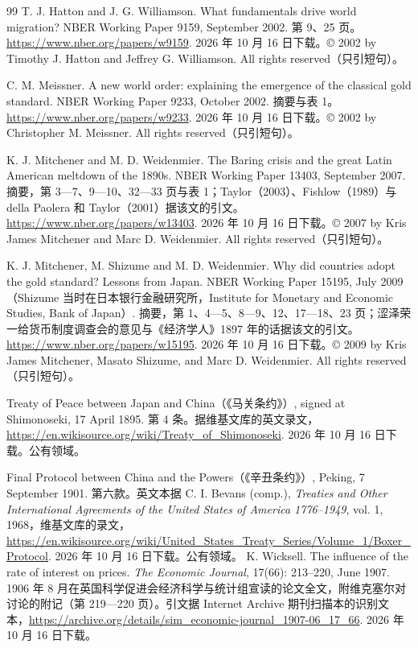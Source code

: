 \begin{thebibliography}{99}
 T. J. Hatton and J. G. Williamson. What fundamentals drive world migration? NBER Working Paper 9159, September 2002. 第 9、25 页。\url{https://www.nber.org/papers/w9159}. 2026 年 10 月 16 日下载。© 2002 by Timothy J. Hatton and Jeffrey G. Williamson. All rights reserved（只引短句）。

 C. M. Meissner. A new world order: explaining the emergence of the classical gold standard. NBER Working Paper 9233, October 2002. 摘要与表 1。\url{https://www.nber.org/papers/w9233}. 2026 年 10 月 16 日下载。© 2002 by Christopher M. Meissner. All rights reserved（只引短句）。

 K. J. Mitchener and M. D. Weidenmier. The Baring crisis and the great Latin American meltdown of the 1890s. NBER Working Paper 13403, September 2007. 摘要，第 3—7、9—10、32—33 页与表 1；Taylor（2003）、Fishlow（1989）与 della Paolera 和 Taylor（2001）据该文的引文。\url{https://www.nber.org/papers/w13403}. 2026 年 10 月 16 日下载。© 2007 by Kris James Mitchener and Marc D. Weidenmier. All rights reserved（只引短句）。

 K. J. Mitchener, M. Shizume and M. D. Weidenmier. Why did countries adopt the gold standard? Lessons from Japan. NBER Working Paper 15195, July 2009（Shizume 当时在日本银行金融研究所，Institute for Monetary and Economic Studies, Bank of Japan）. 摘要，第 1、4—5、8—9、12、17—18、23 页；涩泽荣一给货币制度调查会的意见与《经济学人》1897 年的话据该文的引文。\url{https://www.nber.org/papers/w15195}. 2026 年 10 月 16 日下载。© 2009 by Kris James Mitchener, Masato Shizume, and Marc D. Weidenmier. All rights reserved（只引短句）。

 Treaty of Peace between Japan and China（《马关条约》）, signed at Shimonoseki, 17 April 1895. 第 4 条。据维基文库的英文录文，\url{https://en.wikisource.org/wiki/Treaty_of_Shimonoseki}. 2026 年 10 月 16 日下载。公有领域。

 Final Protocol between China and the Powers（《辛丑条约》）, Peking, 7 September 1901. 第六款。英文本据 C. I. Bevans (comp.), \emph{Treaties and Other International Agreements of the United States of America 1776--1949}, vol. 1, 1968，维基文库的录文，\url{https://en.wikisource.org/wiki/United_States_Treaty_Series/Volume_1/Boxer_Protocol}. 2026 年 10 月 16 日下载。公有领域。
 K. Wicksell. The influence of the rate of interest on prices. \emph{The Economic Journal}, 17(66): 213--220, June 1907. 1906 年 8 月在英国科学促进会经济科学与统计组宣读的论文全文，附维克塞尔对讨论的附记（第 219—220 页）。引文据 Internet Archive 期刊扫描本的识别文本，\url{https://archive.org/details/sim_economic-journal_1907-06_17_66}. 2026 年 10 月 16 日下载。


\end{thebibliography}
